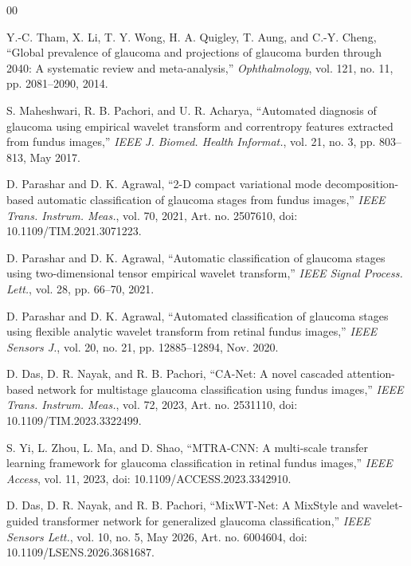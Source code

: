 \documentclass[journal,twoside,web]{ieeecolor}
\begin{document}
\begin{thebibliography}{00}

Y.-C. Tham, X. Li, T. Y. Wong, H. A. Quigley, T. Aung, and C.-Y. Cheng, ``Global prevalence of glaucoma and projections of glaucoma burden through 2040: A systematic review and meta-analysis,'' \emph{Ophthalmology}, vol. 121, no. 11, pp. 2081--2090, 2014.

S. Maheshwari, R. B. Pachori, and U. R. Acharya, ``Automated diagnosis of glaucoma using empirical wavelet transform and correntropy features extracted from fundus images,'' \emph{IEEE J. Biomed. Health Informat.}, vol. 21, no. 3, pp. 803--813, May 2017.

D. Parashar and D. K. Agrawal, ``2-D compact variational mode decomposition-based automatic classification of glaucoma stages from fundus images,'' \emph{IEEE Trans. Instrum. Meas.}, vol. 70, 2021, Art. no. 2507610, doi: 10.1109/TIM.2021.3071223.

D. Parashar and D. K. Agrawal, ``Automatic classification of glaucoma stages using two-dimensional tensor empirical wavelet transform,'' \emph{IEEE Signal Process. Lett.}, vol. 28, pp. 66--70, 2021.

D. Parashar and D. K. Agrawal, ``Automated classification of glaucoma stages using flexible analytic wavelet transform from retinal fundus images,'' \emph{IEEE Sensors J.}, vol. 20, no. 21, pp. 12885--12894, Nov. 2020.

D. Das, D. R. Nayak, and R. B. Pachori, ``CA-Net: A novel cascaded attention-based network for multistage glaucoma classification using fundus images,'' \emph{IEEE Trans. Instrum. Meas.}, vol. 72, 2023, Art. no. 2531110, doi: 10.1109/TIM.2023.3322499.

S. Yi, L. Zhou, L. Ma, and D. Shao, ``MTRA-CNN: A multi-scale transfer learning framework for glaucoma classification in retinal fundus images,'' \emph{IEEE Access}, vol. 11, 2023, doi: 10.1109/ACCESS.2023.3342910.

D. Das, D. R. Nayak, and R. B. Pachori, ``MixWT-Net: A MixStyle and wavelet-guided transformer network for generalized glaucoma classification,'' \emph{IEEE Sensors Lett.}, vol. 10, no. 5, May 2026, Art. no. 6004604, doi: 10.1109/LSENS.2026.3681687.


\end{thebibliography}
\end{document}
